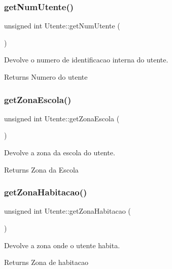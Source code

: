 \subsubsection{\texorpdfstring{get\+Num\+Utente()}{getNumUtente()}}
{\footnotesize\ttfamily unsigned int Utente\+::get\+Num\+Utente (\begin{DoxyParamCaption}{ }\end{DoxyParamCaption})}



Devolve o numero de identificacao interna do utente. 

\begin{DoxyReturn}{Returns}
Numero do utente 
\end{DoxyReturn}
\mbox{\label{class_utente_a9f7ee5806d6a187cf8ab27c2bd36c501}} 
\subsubsection{\texorpdfstring{get\+Zona\+Escola()}{getZonaEscola()}}
{\footnotesize\ttfamily unsigned int Utente\+::get\+Zona\+Escola (\begin{DoxyParamCaption}{ }\end{DoxyParamCaption})}



Devolve a zona da escola do utente. 

\begin{DoxyReturn}{Returns}
Zona da Escola 
\end{DoxyReturn}
\mbox{\label{class_utente_a69163220b163eeef2359745f9d7b92c2}} 
\subsubsection{\texorpdfstring{get\+Zona\+Habitacao()}{getZonaHabitacao()}}
{\footnotesize\ttfamily unsigned int Utente\+::get\+Zona\+Habitacao (\begin{DoxyParamCaption}{ }\end{DoxyParamCaption})}



Devolve a zona onde o utente habita. 

\begin{DoxyReturn}{Returns}
Zona de habitacao 
\end{DoxyReturn}
\mbox{\label{class_utente_ad6d072f72c3d373bbb0a7ace551fff55}} 
